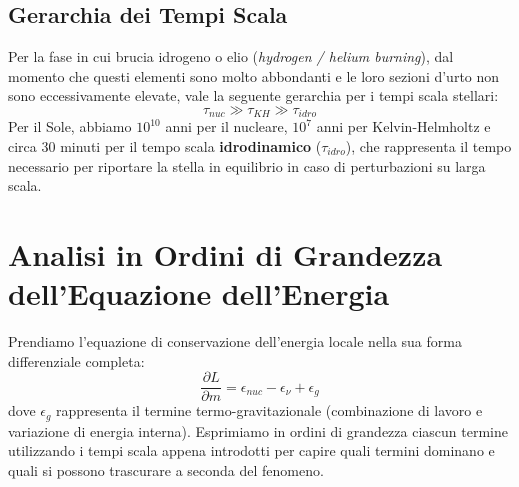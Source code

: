 \subsection{Gerarchia dei Tempi Scala}
Per la fase in cui brucia idrogeno o elio (\textit{hydrogen / helium burning}), dal momento che questi elementi sono molto abbondanti e le loro sezioni d'urto non sono eccessivamente elevate, vale la seguente gerarchia per i tempi scala stellari:
\begin{equation}
\tau_{nuc} \gg \tau_{KH} \gg \tau_{idro}
\end{equation}
Per il Sole, abbiamo $10^{10}$ anni per il nucleare, $10^7$ anni per Kelvin-Helmholtz e circa $30$ minuti per il tempo scala \textbf{idrodinamico} ($\tau_{idro}$), che rappresenta il tempo necessario per riportare la stella in equilibrio in caso di perturbazioni su larga scala.

\section{Analisi in Ordini di Grandezza dell'Equazione dell'Energia}

Prendiamo l'equazione di conservazione dell'energia locale nella sua forma differenziale completa:
\begin{equation}
\frac{\partial L}{\partial m} = \epsilon_{nuc} - \epsilon_{\nu} + \epsilon_g
\end{equation}
dove $\epsilon_g$ rappresenta il termine termo-gravitazionale (combinazione di lavoro e variazione di energia interna). Esprimiamo in ordini di grandezza ciascun termine utilizzando i tempi scala appena introdotti per capire quali termini dominano e quali si possono trascurare a seconda del fenomeno.

